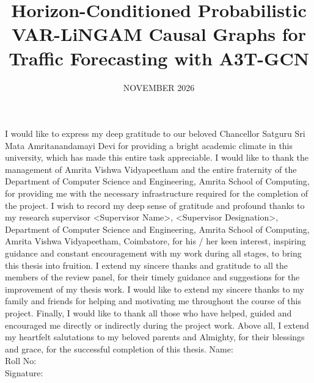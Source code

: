 \documentclass[MTech]{ugthesis}
\begin{document}

\title{Horizon-Conditioned Probabilistic VAR-LiNGAM Causal Graphs for Traffic Forecasting with A3T-GCN} %
\firstauthorregno{[CB.SC.P2CSE25001]}
\date{ NOVEMBER 2026} %

\maketitle
\certificate
\acknowledgements
\normalfont
I would like to express my deep gratitude to our beloved Chancellor Satguru Sri Mata Amritanandamayi Devi for providing a bright academic climate in this university, which has made this entire task appreciable. I would like to thank the management of Amrita Vishwa Vidyapeetham and the entire fraternity of the Department of Computer Science and Engineering, Amrita School of Computing, for providing me with the necessary infrastructure required for the completion of the project.
I wish to record my deep sense of gratitude and profound thanks to my research supervisor <Supervisor Name>, <Supervisor Designation>, Department of Computer Science and Engineering, Amrita School of Computing, Amrita Vishwa Vidyapeetham, Coimbatore, for his / her keen interest, inspiring guidance and constant encouragement with my work during all stages, to bring this thesis into fruition.
I extend my sincere thanks and gratitude to all the members of the review panel, for their timely guidance and suggestions for the improvement of my thesis work.
I would like to extend my sincere thanks to my family and friends for helping and motivating me throughout the course of this project.
Finally, I would like to thank all those who have helped, guided and encouraged me directly or indirectly during the project work.
Above all, I extend my heartfelt salutations to my beloved parents and Almighty, for their blessings and grace, for the successful completion of this thesis.
\vskip 25pt
\noindent
Name:\\
Roll No:\\
Signature:\\
\end{document}
